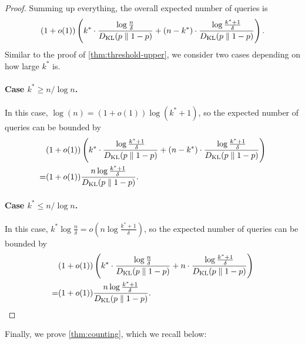\begin{proof}
Summing up everything, the overall expected number of queries is
\[(1+o(1)) \left(k^* \cdot  \frac{\log \frac{n}{\delta}}{D_{\operatorname{\mathrm{KL}}}(p \parallel 1-p)} + (n - k^*) \cdot \frac{\log\frac{k^*+1}{\delta}}{D_{\operatorname{\mathrm{KL}}}(p \parallel 1-p)}\right).
\]
Similar to the proof of \cref{thm:threshold-upper}, we consider two cases depending on how large $k^*$ is.

\paragraph{Case $k^* \ge n/\log n$.}
In this case, $\log(n) = (1+o(1)) \log (k^*+1)$, so the expected number of queries can be bounded by
  \begin{align*}
    & (1+o(1)) \left(k^* \cdot  \frac{\log \frac{k^*+1}{\delta}}{D_{\operatorname{\mathrm{KL}}}(p \parallel 1-p)} + (n - k^*) \cdot \frac{\log \frac{k^*+1}{\delta}}{D_{\operatorname{\mathrm{KL}}}(p \parallel 1-p)}\right)\\
    =& (1+o(1)) \frac{n \log \frac{k^*+1}{\delta}}{D_{\operatorname{\mathrm{KL}}}(p \parallel 1-p)}.
  \end{align*}

\paragraph{Case $k^* \le n/\log n$.}
In this case, $k^* \log \frac{n}{\delta} = o(n \log \frac{k^*+1}{\delta})$, so the expected number of queries can be bounded by
   \begin{align*}
    & (1+o(1)) \left(k^* \cdot  \frac{\log \frac{n}{\delta}}{D_{\operatorname{\mathrm{KL}}}(p \parallel 1-p)} + n \cdot \frac{\log \frac{k^*+1}{\delta}}{D_{\operatorname{\mathrm{KL}}}(p \parallel 1-p)}\right)\\
    =& (1+o(1)) \frac{n \log \frac{k^*+1}{\delta}}{D_{\operatorname{\mathrm{KL}}}(p \parallel 1-p)}.
  \end{align*}
\end{proof}


Finally, we prove \cref{thm:counting}, which we recall below:

